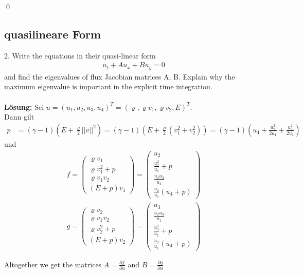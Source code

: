 \documentclass[11pt]{scrartcl}
\begin{document}
\qed
\newline
\noindent 
\subsection{quasilineare Form}

2. Write the equations in their quasi-linear form
\begin{align*}
	u_t+Au_x + Bu_y =0 
\end{align*}
and find the eigenvalues of flux Jacobian matrices A, B. Explain why
the maximum eigenvalue is important in the explicit time integration.
\\
\\
\textbf{Lösung:}
Sei $u=(u_1,u_2,u_3,u_4)^T=(\varrho , \varrho v_1, \varrho v_2, E)^T$. \\
Dann gilt 
\begin{align*}
	p&=(\gamma -1)(E+\frac{\varrho}{2} ||v||^2)
	=(\gamma -1)(E+\frac{\varrho}{2} (v_1^2+v_2^2))
	=(\gamma -1)(u_4+ \frac{u_2^2}{2 u_1}+\frac{u_3^2}{2 u_1} )
\end{align*}
und 
\begin{align*}
	f=\left(\begin{array}{c} \varrho v_1 \\ \varrho v_1^2 + p \\ \varrho v_1 v_2 \\ (E+p)v_1 \end{array}\right)= \left(\begin{array}{c} u_2 \\ \frac{u_2^2}{u_1} + p \\ \frac{u_2 u_3}{u_1} \\ \frac{u_2}{u_1} (u_4+p) \end{array}\right)\\
	g=\left(\begin{array}{c} \varrho v_2 \\ \varrho v_1 v_2 \\ \varrho v_2^2+p \\ (E+p)v_2 \end{array}\right)=
	\left(\begin{array}{c} u_3 \\ \frac{u_2 u_3}{u_1} \\ \frac{u_3^2}{u_1} + p \\ \frac{u_3}{u_1} (u_4+p) \end{array}\right)
\end{align*}

Altogether we get the matrices $A=\frac{\partial f}{\partial u}$ and $B=\frac{\partial g}{\partial u}$
\end{document}
